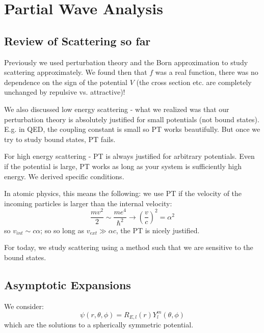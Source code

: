 \section{Partial Wave Analysis}

\subsection{Review of Scattering so far}
Previously we used perturbation theory and the Born approximation to study scattering approximately. We found then that $f$ was a real function, there was no dependence on the sign of the potential $V$ (the cross section etc. are completely unchanged by repulsive vs. attractive)!

We also discussed low energy scattering - what we realized was that our perturbation theory is absolutely justified for small potentials (not bound states). E.g. in QED, the coupling constant is small so PT works beautifully. But once we try to study bound states, PT fails.

For high energy scattering - PT is always justified for arbitrary potentials. Even if the potential is large, PT works as long as your system is sufficiently high energy. We derived specific conditions.

In atomic physics, this means the following: we use PT if the velocity of the incoming particles is larger than the internal velocity:
\begin{equation}
    \frac{mv^2}{2} \sim \frac{me^4}{\hbar^2} \to \left(\frac{v}{c}\right)^2 = \alpha^2
\end{equation}
so $v_{int} \sim c \alpha$; so so long as $v_{ext} \gg \alpha c$, the PT is nicely justified.

For today, we study scattering using a method such that we are sensitive to the bound states.

\subsection{Asymptotic Expansions}
We consider:
\begin{equation}
    \psi(r, \theta, \phi) = R_{E, l}(r)Y_l^m(\theta, \phi)
\end{equation}
which are the solutions to a spherically symmetric potential.

